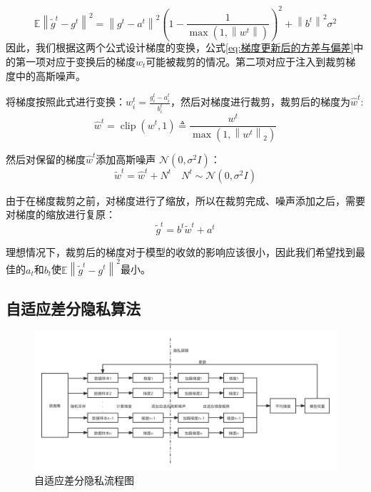 \begin{equation}
\mathbb{E}\left\|\tilde{g}^{t}-g^{t}\right\|^{2}=\left\|g^{t}-a^{t}\right\|^{2}\left(1-\frac{1}{\max \left(1,\left\|w^{t}\right\|\right)}\right)^{2}+\left\|b^{t}\right\|^{2} \sigma^{2}
\end{equation}
因此，我们根据这两个公式设计梯度的变换，公式\ref{eq:梯度更新后的方差与偏差}中的第一项对应于变换后的梯度$w_{t}$可能被裁剪的情况。第二项对应于注入到裁剪梯度中的高斯噪声。

将梯度按照此式进行变换：$w_{i}^{t}=\frac{g_{i}^{t}-a_{i}^{t}}{b_{i}^{t}}$，然后对梯度进行裁剪，裁剪后的梯度为$\hat{w}^{t}$:
\begin{equation}
\hat{w}^{t}=\operatorname{clip}\left(w^{t}, 1\right) \triangleq \frac{w^{t}}{\max \left(1,\left\|w^{t}\right\|_{2}\right)}
\end{equation}

然后对保留的梯度$\hat{w}^{t}$添加高斯噪声 $\mathcal{N}\left(0, \sigma^{2} I\right)$：
\begin{equation}
\tilde{w}^{t}=\hat{w}^{t}+N^{t} \quad N^{t} \sim \mathcal{N}\left(0, \sigma^{2} I\right)
\end{equation}

由于在梯度裁剪之前，对梯度进行了缩放，所以在裁剪完成、噪声添加之后，需要对梯度的缩放进行复原：
\begin{equation}
\tilde{g}^{t}=b^{t} \tilde{w}^{t}+a^{t}
\end{equation}

理想情况下，裁剪后的梯度对于模型的收敛的影响应该很小，因此我们希望找到最佳的$a_{t}$和$b_{t}$使$\mathbb{E}\left\|\tilde{g}^{t}-g^{t}\right\|^{2}$最小。 

\subsection{自适应差分隐私算法}

\begin{figure}[!hbt]
\centering
	\includegraphics[scale=0.3]{fig2/C3/自适应差分隐私流程图}%
	\caption{自适应差分隐私流程图}
	\label{fig:自适应差分隐私流程图}	
\end{figure}

